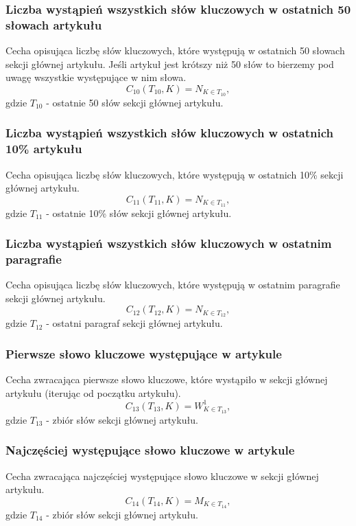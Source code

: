 \documentclass{classrep}
\begin{document}
\subsubsection{Liczba wystąpień wszystkich słów kluczowych w ostatnich 50 słowach artykułu}
Cecha opisująca liczbę słów kluczowych, które występują w ostatnich 50 słowach sekcji głównej artykułu. Jeśli artykuł jest krótszy niż 50 słów to bierzemy pod uwagę wszystkie występujące w nim słowa.
\begin{equation}
            C_{10}(T_{10},K) = N_{K \in T_{10}},
 \end{equation}	
 gdzie $T_{10}$ - ostatnie 50 słów sekcji głównej artykułu.

\subsubsection{Liczba wystąpień wszystkich słów kluczowych w ostatnich 10\% artykułu}
Cecha opisująca liczbę słów kluczowych, które występują w ostatnich 10\% sekcji głównej artykułu.
\begin{equation}
            C_{11}(T_{11},K) = N_{K \in T_{11}},
 \end{equation}	
 gdzie $T_{11}$ - ostatnie 10\% słów sekcji głównej artykułu.

\subsubsection{Liczba wystąpień wszystkich słów kluczowych w ostatnim paragrafie}
Cecha opisująca liczbę słów kluczowych, które występują w ostatnim paragrafie sekcji głównej artykułu.
\begin{equation}
            C_{12}(T_{12},K) = N_{K \in T_{12}},
 \end{equation}	
 gdzie $T_{12}$ - ostatni paragraf sekcji głównej artykułu.

\subsubsection{Pierwsze słowo kluczowe występujące w artykule}
Cecha zwracająca pierwsze słowo kluczowe, które wystąpiło w sekcji głównej artykułu (iterując od początku artykułu).
\begin{equation}
            C_{13}(T_{13},K) = W^{1}_{K \in T_{13}},
 \end{equation}	
 gdzie $T_{13}$ - zbiór słów sekcji głównej artykułu.


\subsubsection{Najczęściej występujące słowo kluczowe w artykule}
Cecha zwracająca najczęściej występujące słowo kluczowe w sekcji głównej artykułu.
\begin{equation}
            C_{14}(T_{14},K) = M_{K \in T_{14}},
 \end{equation}	
 gdzie $T_{14}$ - zbiór słów sekcji głównej artykułu.
\end{document}
